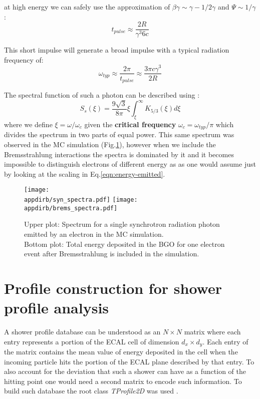 at high energy we can safely use the approximation of $\beta \gamma \sim \gamma - 1/2\gamma$ and $\Psi \sim 1/\gamma$:
\[t_{pulse} \approx \frac{2 R}{\gamma^3 6c}\]

This short impulse will generate a broad impulse with a typical radiation frequency of:
\[\omega_{typ} \approx \frac{2 \pi}{t_{pulse}} \approx \frac{3 \pi  c \gamma^3}{2 R} \]

The spectral function of such a photon can be described using \cite{synchrotron-radiation}:
\begin{equation}
\label{eqn:sync_spectrum}
S_s(\xi) = \frac{9 \sqrt{3}}{8 \pi}\xi \int_{\xi}^{\infty}K_{5/3}(\xi)d\xi
\end{equation}
where we define $\xi = \omega/\omega_c$ given the \textbf{critical frequency} $\omega_c =\omega_{typ}/\pi$ which divides the spectrum in two parts of equal power. This same spectrum was observed in the MC simulation (Fig.\ref{fig:synch_spectrum}), however when we include the Bremsstrahlung interactions the spectra is dominated by it and it becomes impossible to distinguish electrons of different energy as as one would assume just by looking at the scaling in Eq.\ref{eqn:energy-emitted}.


\begin{figure}[h!]
\centering
\texttt{[image: \\appdirb/syn\_spectra.pdf]}
\texttt{[image: \\appdirb/brems\_spectra.pdf]}
\caption{Upper plot: Spectrum for a single synchrotron radiation photon emitted by an electron in the MC simulation. \\
Bottom plot: Total energy deposited in the BGO for one electron event after Bremsstrahlung is included in the simulation.}
\label{fig:synch_spectrum}
\end{figure}

\FloatBarrier\noindent
\section{Profile construction for shower profile analysis}
\label{Appb:sec:make_profile}

A shower profile database can be understood as an $N\times N$ matrix
where each entry represents a portion of the ECAL cell of dimension
$d_x \times d_y$. Each entry of the matrix contains the mean value of
energy deposited in the cell when the incoming particle hits the
portion of the ECAL plane described by that entry. To also
account for the deviation that such a shower can have as a function of the
hitting point one would need a second matrix to encode such
information. To build such database the root class \textit{TProfile2D} was used \cite{root-tprofile}.

